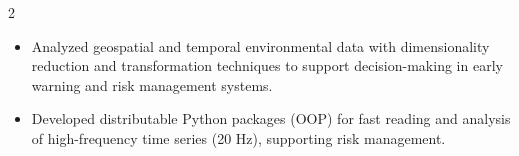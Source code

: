 \documentclass[10pt,a4paper,ragged2e,withhyper]{altacv}
\begin{document}
\begin{paracol}{2}
\divider


\begin{itemize}
\item Analyzed geospatial and temporal environmental data with dimensionality reduction and transformation techniques to support decision-making in early warning and risk management systems.
\item Developed distributable Python packages (OOP) for fast reading and analysis of high-frequency time series (20 Hz), supporting risk management.
\end{itemize}


\end{paracol}

\clearpage
\end{document}
